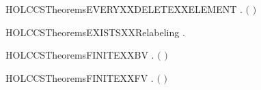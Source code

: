 \newcommand{\HOLCCSTheoremsDELETEXXELEMENTXXFILTER}{\UseVerbatim{HOLCCSTheoremsDELETEXXELEMENTXXFILTER}}
\begin{SaveVerbatim}{HOLCCSTheoremsEVERYXXDELETEXXELEMENT}
\HOLTokenTurnstile{} \HOLSymConst{\HOLTokenForall{}}  .   \HOLSymConst{\HOLTokenConj{}}   \ensuremath{(}  \ensuremath{)} \HOLSymConst{\HOLTokenImp{}}   
\end{SaveVerbatim}
\newcommand{\HOLCCSTheoremsEVERYXXDELETEXXELEMENT}{\UseVerbatim{HOLCCSTheoremsEVERYXXDELETEXXELEMENT}}
\begin{SaveVerbatim}{HOLCCSTheoremsEXISTSXXRelabeling}
\HOLTokenTurnstile{} \HOLSymConst{\HOLTokenExists{}}.  
\end{SaveVerbatim}
\newcommand{\HOLCCSTheoremsEXISTSXXRelabeling}{\UseVerbatim{HOLCCSTheoremsEXISTSXXRelabeling}}
\begin{SaveVerbatim}{HOLCCSTheoremsFINITEXXBV}
\HOLTokenTurnstile{} \HOLSymConst{\HOLTokenForall{}}.  \ensuremath{(} \ensuremath{)}
\end{SaveVerbatim}
\newcommand{\HOLCCSTheoremsFINITEXXBV}{\UseVerbatim{HOLCCSTheoremsFINITEXXBV}}
\begin{SaveVerbatim}{HOLCCSTheoremsFINITEXXFV}
\HOLTokenTurnstile{} \HOLSymConst{\HOLTokenForall{}}.  \ensuremath{(} \ensuremath{)}
\end{SaveVerbatim}
\newcommand{\HOLCCSTheoremsFINITEXXFV}{\UseVerbatim{HOLCCSTheoremsFINITEXXFV}}
